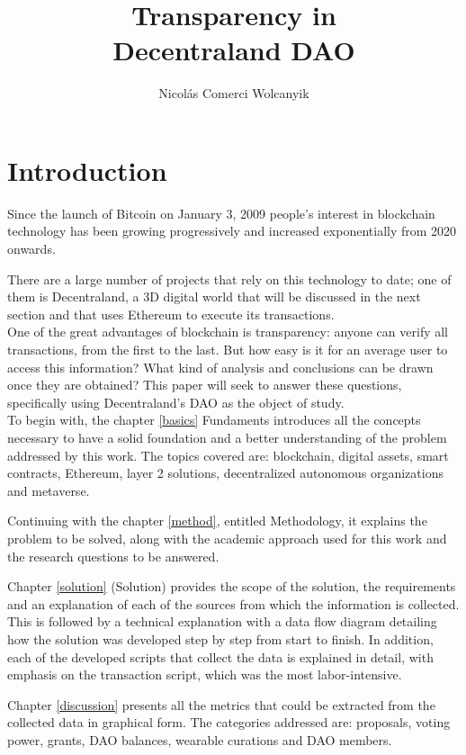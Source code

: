 \documentclass[MSE,Master,english]{twbook}%
\title{Transparency in\\Decentraland DAO}
\author{Nicol{\'a}s Comerci Wolcanyik}
\begin{document}
\maketitle

%
%
\chapter{Introduction\label{intro}}
Since the launch of Bitcoin on January 3, 2009 people's interest in blockchain technology has been growing progressively and increased exponentially from 2020 onwards. 

There are a large number of projects that rely on this technology to date; one of them is Decentraland, a 3D digital world that will be discussed in the next section and that uses Ethereum to execute its transactions. \\

One of the great advantages of blockchain is transparency: anyone can verify all transactions, from the first to the last. But how easy is it for an average user to access this information? What kind of analysis and conclusions can be drawn once they are obtained? This paper will seek to answer these questions, specifically using Decentraland's DAO as the object of study. \\

To begin with, the chapter \ref{basics} Fundaments introduces all the concepts necessary to have a solid foundation and a better understanding of the problem addressed by this work. The topics covered are: blockchain, digital assets, smart contracts, Ethereum, layer 2 solutions, decentralized autonomous organizations and metaverse.

Continuing with the chapter \ref{method}, entitled Methodology, it explains the problem to be solved, along with the academic approach used for this work and the research questions to be answered.

Chapter \ref{solution} (Solution) provides the scope of the solution, the requirements and an explanation of each of the sources from which the information is collected. This is followed by a technical explanation with a data flow diagram detailing how the solution was developed step by step from start to finish. In addition, each of the developed scripts that collect the data is explained in detail, with emphasis on the transaction script, which was the most labor-intensive.

Chapter \ref{discussion} presents all the metrics that could be extracted from the collected data in graphical form. The categories addressed are: proposals, voting power, grants, DAO balances, wearable curations and DAO members.
\end{document}
